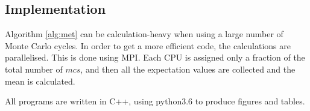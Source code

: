 \subsection{Implementation}
Algorithm \ref{alg:met} can be calculation-heavy when using a large number of Monte Carlo cycles. In order to get a more efficient code, the calculations are parallelised. This is done using MPI. Each CPU is assigned only a fraction of the total number of $mcs$, and then all the  expectation values are collected and the mean is calculated. 

All programs are written in C++, using python3.6 to produce figures and tables.   